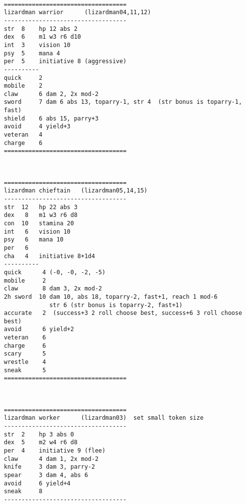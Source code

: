 \

\goodbreak \begin{samepage} \small \begin{verbatim}
===================================
lizardman warrior      (lizardman04,11,12)
-----------------------------------
str  8    hp 12 abs 2
dex  6    m1 w3 r6 d10
int  3    vision 10
psy  5    mana 4
per  5    initiative 8 (aggressive)
----------
quick     2
mobile    2
claw      6 dam 2, 2x mod-2
sword     7 dam 6 abs 13, toparry-1, str 4  (str bonus is toparry-1, fast)
shield    6 abs 15, parry+3
avoid     4 yield+3
veteran   4
charge    6
===================================
\end{verbatim} \normalsize \end{samepage}

\

\goodbreak \begin{samepage} \small \begin{verbatim}
===================================
lizardman chieftain   (lizardman05,14,15)
-----------------------------------
str  12   hp 22 abs 3
dex   8   m1 w3 r6 d8
con  10   stamina 20
int   6   vision 10
psy   6   mana 10
per   6
cha   4   initiative 8+1d4
----------
quick      4 (-0, -0, -2, -5)
mobile     2
claw       8 dam 3, 2x mod-2
2h sword  10 dam 10, abs 18, toparry-2, fast+1, reach 1 mod-6
             str 6 (str bonus is toparry-2, fast+1)
accurate   2  (success+3 2 roll choose best, success+6 3 roll choose best)
avoid      6 yield+2
veteran    6
charge     6
scary      5
wrestle    4
sneak      5
===================================
\end{verbatim} \normalsize \end{samepage}

\

\goodbreak \begin{samepage} \small \begin{verbatim}
===================================
lizardman worker      (lizardman03)  set small token size
-----------------------------------
str  2    hp 3 abs 0
dex  5    m2 w4 r6 d8
per  4    initiative 9 (flee)
claw      4 dam 1, 2x mod-2
knife     3 dam 3, parry-2
spear     3 dam 4, abs 6
avoid     6 yield+4
sneak     8
-----------------------------------
\end{verbatim} \normalsize \end{samepage}






\goodbreak
{}

